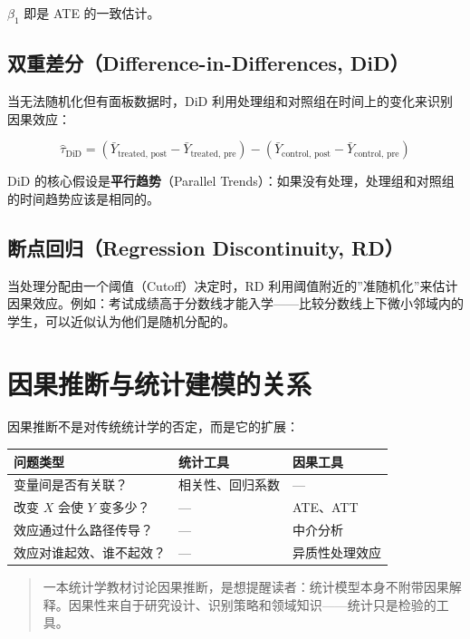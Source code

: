 \documentclass[
]{book}
\begin{document}
\(\beta_1\) 即是 ATE 的一致估计。

\subsection{双重差分（Difference-in-Differences, DiD）}\label{ux53ccux91cdux5deeux5206difference-in-differences-did}

当无法随机化但有面板数据时，DiD 利用处理组和对照组在时间上的变化来识别因果效应：

\[\hat{\tau}_{\text{DiD}} = (\bar{Y}_{\text{treated, post}} - \bar{Y}_{\text{treated, pre}}) - (\bar{Y}_{\text{control, post}} - \bar{Y}_{\text{control, pre}})\]

DiD 的核心假设是\textbf{平行趋势}（Parallel Trends）：如果没有处理，处理组和对照组的时间趋势应该是相同的。

\subsection{断点回归（Regression Discontinuity, RD）}\label{ux65adux70b9ux56deux5f52regression-discontinuity-rd}

当处理分配由一个阈值（Cutoff）决定时，RD 利用阈值附近的''准随机化''来估计因果效应。例如：考试成绩高于分数线才能入学------比较分数线上下微小邻域内的学生，可以近似认为他们是随机分配的。

\section{因果推断与统计建模的关系}\label{ux56e0ux679cux63a8ux65adux4e0eux7edfux8ba1ux5efaux6a21ux7684ux5173ux7cfb}

因果推断不是对传统统计学的否定，而是它的扩展：

\begin{longtable}[]{@{}lll@{}}
\toprule\noalign{}
问题类型 & 统计工具 & 因果工具 \\
\midrule\noalign{}
\endhead
\bottomrule\noalign{}
\endlastfoot
变量间是否有关联？ & 相关性、回归系数 & --- \\
改变 \(X\) 会使 \(Y\) 变多少？ & --- & ATE、ATT \\
效应通过什么路径传导？ & --- & 中介分析 \\
效应对谁起效、谁不起效？ & --- & 异质性处理效应 \\
\end{longtable}

\begin{quote}
一本统计学教材讨论因果推断，是想提醒读者：统计模型本身不附带因果解释。因果性来自于研究设计、识别策略和领域知识------统计只是检验的工具。
\end{quote}
\end{document}
